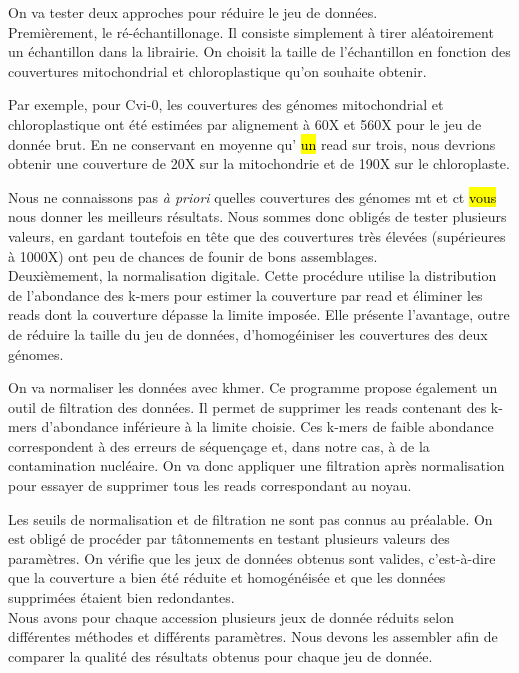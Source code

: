 \documentclass[a4paper]{article}
\newcommand{\rewrite}[1]{\todo[color=green!40]{#1}}
\newcommand{\hlrewrite}[2]{\sethlcolor{green} \hl{#1} \rewrite{#2}}
\begin{document}
On va tester deux approches pour réduire le jeu de données. \\

Premièrement, le ré-échantillonage. Il consiste simplement à tirer aléatoirement un échantillon dans la librairie. On choisit la taille de l'échantillon en fonction des couvertures mitochondrial et chloroplastique qu'on souhaite obtenir.

Par exemple, pour Cvi-0, les couvertures des génomes mitochondrial et chloroplastique ont été estimées par alignement à 60X et 560X pour le jeu de donnée brut. En ne conservant en moyenne qu'\hlrewrite{un}{une} read sur trois, nous devrions obtenir une couverture de 20X sur la mitochondrie et de 190X sur le chloroplaste. 

Nous ne connaissons pas \textit{à priori} quelles couvertures des génomes mt et ct \hlrewrite{vous}{vont} nous donner les meilleurs résultats. Nous sommes donc obligés de tester plusieurs valeurs, en gardant toutefois en tête que des couvertures très élevées (supérieures à 1000X) ont peu de chances de founir de bons assemblages.\\

Deuxièmement, la normalisation digitale. Cette procédure utilise la distribution de l'abondance des k-mers pour estimer la couverture par read et éliminer les reads dont la couverture dépasse la limite imposée.\cite{brown2012reference} Elle présente l'avantage, outre de réduire la taille du jeu de données, d'homogéiniser les couvertures des deux génomes.

On va normaliser les données avec khmer. Ce programme propose également un outil de filtration des données. Il permet de supprimer les reads contenant des k-mers d'abondance inférieure à la limite choisie. Ces k-mers de faible abondance correspondent à des erreurs de séquençage et, dans notre cas, à de la contamination nucléaire. On va donc appliquer une filtration après normalisation pour essayer de supprimer tous les reads correspondant au noyau. 

Les seuils de normalisation et de filtration ne sont pas connus au préalable. On est obligé de procéder par tâtonnements en testant plusieurs valeurs des paramètres. On vérifie que les jeux de données obtenus sont valides, c'est-à-dire que la couverture a bien été réduite et homogénéisée et que les données supprimées étaient bien redondantes.\\ 

Nous avons pour chaque accession plusieurs jeux de donnée réduits selon  différentes méthodes et différents paramètres. Nous devons les assembler afin de comparer la qualité des résultats obtenus pour chaque jeu de donnée. 
\end{document}
